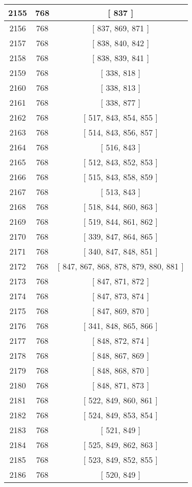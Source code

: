 \begin{center}
\begin{longtable}[H]{|| c c c ||}
\hline
2155 & 768 & [ 837 ] \\ 
\hline
2156 & 768 & [ 837, 869, 871 ] \\ 
\hline
2157 & 768 & [ 838, 840, 842 ] \\ 
\hline
2158 & 768 & [ 838, 839, 841 ] \\ 
\hline
2159 & 768 & [ 338, 818 ] \\ 
\hline
2160 & 768 & [ 338, 813 ] \\ 
\hline
2161 & 768 & [ 338, 877 ] \\ 
\hline
2162 & 768 & [ 517, 843, 854, 855 ] \\ 
\hline
2163 & 768 & [ 514, 843, 856, 857 ] \\ 
\hline
2164 & 768 & [ 516, 843 ] \\ 
\hline
2165 & 768 & [ 512, 843, 852, 853 ] \\ 
\hline
2166 & 768 & [ 515, 843, 858, 859 ] \\ 
\hline
2167 & 768 & [ 513, 843 ] \\ 
\hline
2168 & 768 & [ 518, 844, 860, 863 ] \\ 
\hline
2169 & 768 & [ 519, 844, 861, 862 ] \\ 
\hline
2170 & 768 & [ 339, 847, 864, 865 ] \\ 
\hline
2171 & 768 & [ 340, 847, 848, 851 ] \\ 
\hline
2172 & 768 & [ 847, 867, 868, 878, 879, 880, 881 ] \\ 
\hline
2173 & 768 & [ 847, 871, 872 ] \\ 
\hline
2174 & 768 & [ 847, 873, 874 ] \\ 
\hline
2175 & 768 & [ 847, 869, 870 ] \\ 
\hline
2176 & 768 & [ 341, 848, 865, 866 ] \\ 
\hline
2177 & 768 & [ 848, 872, 874 ] \\ 
\hline
2178 & 768 & [ 848, 867, 869 ] \\ 
\hline
2179 & 768 & [ 848, 868, 870 ] \\ 
\hline
2180 & 768 & [ 848, 871, 873 ] \\ 
\hline
2181 & 768 & [ 522, 849, 860, 861 ] \\ 
\hline
2182 & 768 & [ 524, 849, 853, 854 ] \\ 
\hline
2183 & 768 & [ 521, 849 ] \\ 
\hline
2184 & 768 & [ 525, 849, 862, 863 ] \\ 
\hline
2185 & 768 & [ 523, 849, 852, 855 ] \\ 
\hline
2186 & 768 & [ 520, 849 ] \\ 

\end{longtable}
\end{center}
